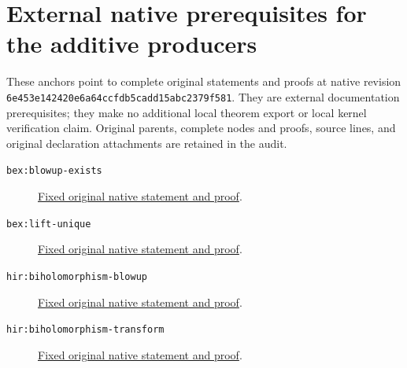 \section{External native prerequisites for the additive producers}
These anchors point to complete original statements and proofs at native
revision \texttt{6e453e142420e6a64ccfdb5cadd15abc2379f581}. They are external
documentation prerequisites; they make no additional local theorem export
or local kernel verification claim. Original parents, complete nodes and
proofs, source lines, and original declaration attachments are retained
in the audit.
\begin{description}
\item[\texttt{bex:blowup-exists}]\label{bex:blowup-exists}
\href{https://github.com/MingchenXia/archon-nakamaye/blob/6e453e142420e6a64ccfdb5cadd15abc2379f581/TranscendentalNakamaye/blueprint/src/blowup-existence.tex#L245}{Fixed original native statement and proof}.
\item[\texttt{bex:lift-unique}]\label{bex:lift-unique}
\href{https://github.com/MingchenXia/archon-nakamaye/blob/6e453e142420e6a64ccfdb5cadd15abc2379f581/TranscendentalNakamaye/blueprint/src/blowup-existence.tex#L205}{Fixed original native statement and proof}.
\item[\texttt{hir:biholomorphism-blowup}]\label{hir:biholomorphism-blowup}
\href{https://github.com/MingchenXia/archon-nakamaye/blob/6e453e142420e6a64ccfdb5cadd15abc2379f581/TranscendentalNakamaye/blueprint/src/hironaka.tex#L741}{Fixed original native statement and proof}.
\item[\texttt{hir:biholomorphism-transform}]\label{hir:biholomorphism-transform}
\href{https://github.com/MingchenXia/archon-nakamaye/blob/6e453e142420e6a64ccfdb5cadd15abc2379f581/TranscendentalNakamaye/blueprint/src/hironaka.tex#L761}{Fixed original native statement and proof}.
\end{description}
